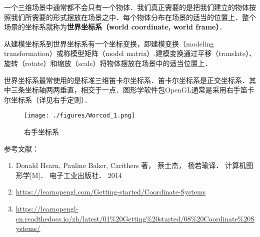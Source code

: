 

一个三维场景中通常都不会只有一个物体．我们真正需要的是把我们建立的物体按照我们所需要的形式摆放在场景之中．每个物体分布在场景的适当的位置上．整个场景的坐标系就称为\textbf{世界坐标系（world coordinate, world frame）}．

从建模坐标系到世界坐标系有一个坐标变换，即建模变换（modeling transformation）或称模型矩阵（model matrix）.建模变换通过平移（translate）、旋转（rotate）和缩放（scale）将物体摆放在场景中的适当位置上．

世界坐标系最常使用的是标准三维笛卡尔坐标系．笛卡尔坐标系是正交坐标系．其中三条坐标轴两两垂直，相交于一点．图形学软件包OpenGL通常是采用右手笛卡尔坐标系（详见右手定则）．


\begin{figure}[ht]
\centering
\texttt{[image: ./figures/Worcod\_1.png]}
\caption{右手坐标系} \label{Worcod_fig1}
\end{figure}


参考文献：
\begin{enumerate}
\item Donald Hearn, Pauline Baker, Carithers 著， 蔡士杰， 杨若瑜译． 计算机图形学[M]． 电子工业出版社． 2014
\item \href{https://learnopengl.com/Getting-started/Coordinate-Systems}{https://learnopengl.com/Getting-started/Coordinate-Systems}
\item \href{https://learnopengl-cn.readthedocs.io/zh/latest/01\%20Getting\%20started/08\%20Coordinate\%20Systems/}{https://learnopengl-cn.readthedocs.io/zh/latest/01\%20Getting\%20started/08\%20Coordinate\%20Systems/}
\end{enumerate}